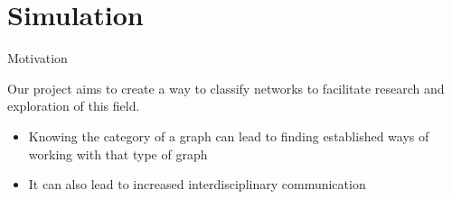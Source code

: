 \documentclass{beamer}
\begin{document}
\section{Simulation}

\begin{frame}{Motivation}
\begin{center}
Our project aims to create a way to classify networks to facilitate research and exploration of this field.
\end{center}

    \begin{itemize}
        \item Knowing the category of a graph can lead to finding established ways of working with that type of graph
        \item It can also lead to increased interdisciplinary communication
    \end{itemize}
    
\end{frame}
\end{document}
